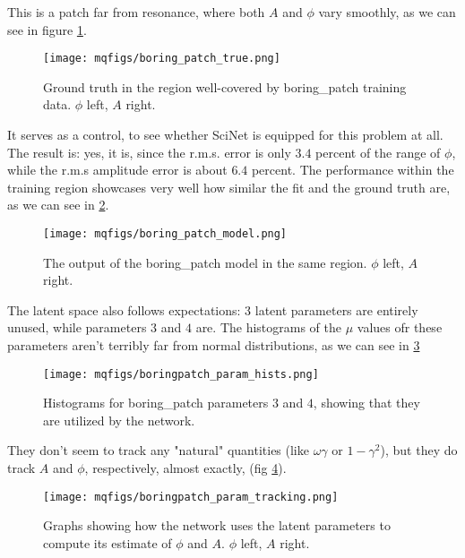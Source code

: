 \documentclass[aps,prl,preprint,groupedaddress]{revtex4-1}
\begin{document}
This is a patch far from resonance, where both $A$ and $\phi$ vary smoothly, as we can see in figure \ref{boringPhiA}. 

\begin{figure}[h]
   \centering
   \texttt{[image: mqfigs/boring\_patch\_true.png]}
   \caption{\label{boringPhiA} Ground truth in the region well-covered by boring\_patch training data. $\phi$ left, $A$ right.}
\end{figure}

It serves as a control, to see whether SciNet is equipped for this problem at all. The result is: yes, it is, since the r.m.s. error is only $3.4$ percent of the range of $\phi$, while the r.m.s amplitude error is about $6.4$ percent. The performance within the training region showcases very well how similar the fit and the ground truth are, as we can see in \ref{boringModel}.

\begin{figure}[h]
  \centering
   \texttt{[image: mqfigs/boring\_patch\_model.png]}
   \caption{\label{boringModel} The output of the boring\_patch model in the same region. $\phi$ left, $A$ right.}
\end{figure}

The latent space also follows expectations: 3 latent parameters are entirely unused, while parameters $3$ and $4$ are. The histograms of the $\mu$ values ofr these parameters aren't terribly far from normal distributions, as we can see in \ref{boringParamHists}

\begin{figure}[h]
   \centering
   \texttt{[image: mqfigs/boringpatch\_param\_hists.png]}
   \caption{\label{boringParamHists} Histograms for boring\_patch parameters $3$ and $4$, showing that they are utilized by the network.}
\end{figure}

They don't seem to track any "natural" quantities (like $\omega \gamma$ or $1 - \gamma^2$), but they do track $A$ and $\phi$, respectively, almost exactly, (fig \ref{boringParamTracking}).

\begin{figure}[h]
   \centering
   \texttt{[image: mqfigs/boringpatch\_param\_tracking.png]}
   \caption{\label{boringParamTracking} Graphs showing how the network uses the latent parameters to compute its estimate of $\phi$ and $A$. $\phi$ left, $A$ right.}
\end{figure}
\end{document}

